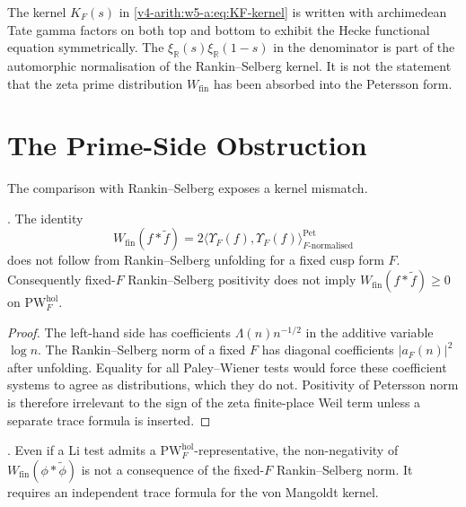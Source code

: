 \begin{remark}
\label{v4-arith:w5-a:rem:gamma-absorbed}
The kernel \(K_{F}(s)\) in \eqref{v4-arith:w5-a:eq:KF-kernel} is
written with archimedean Tate gamma factors on both top and bottom to
exhibit the Hecke functional equation symmetrically. The
\(\xi_{\mathbb{R}}(s)\xi_{\mathbb{R}}(1-s)\) in the denominator is
part of the automorphic normalisation of the Rankin--Selberg kernel.
It is not the statement that the zeta prime distribution
\(W_{\mathrm{fin}}\) has been absorbed into the Petersson form.
\end{remark}

\section{The Prime-Side Obstruction}
\label{v4-arith:w5-a:prime-closure}

The comparison with Rankin--Selberg exposes a kernel mismatch.

\begin{theorem}
\label{v4-arith:w5-a:thm:prime-side}
\ClaimStatusProvedHere. The identity
\[
W_{\mathrm{fin}}(f*\widetilde f)
=2\bigl\langle\Upsilon_F(f),\Upsilon_F(f)\bigr\rangle^{\mathrm{Pet}}_{F\text{-normalised}}
\]
does not follow from Rankin--Selberg unfolding for a fixed cusp form
\(F\). Consequently fixed-\(F\) Rankin--Selberg positivity does not imply
\(W_{\mathrm{fin}}(f*\widetilde f)\geq0\) on
\(\mathrm{PW}^{\mathrm{hol}}_F\).
\end{theorem}

\begin{proof}
The left-hand side has coefficients \(\Lambda(n)n^{-1/2}\) in the
additive variable \(\log n\). The Rankin--Selberg norm of a fixed \(F\)
has diagonal coefficients \(|a_F(n)|^2\) after unfolding. Equality for
all Paley--Wiener tests would force these coefficient systems to agree
as distributions, which they do not. Positivity of Petersson norm is
therefore irrelevant to the sign of the zeta finite-place Weil term
unless a separate trace formula is inserted.
\end{proof}

\begin{corollary}
\label{v4-arith:w5-a:cor:HPLi-restricted}
\ClaimStatusProvedHere. Even if a Li test admits a
\(\mathrm{PW}^{\mathrm{hol}}_{F}\)-representative, the non-negativity of
\(W_{\mathrm{fin}}(\phi*\widetilde\phi)\) is not a consequence of the
fixed-\(F\) Rankin--Selberg norm. It requires an independent trace
formula for the von Mangoldt kernel.
\end{corollary}

